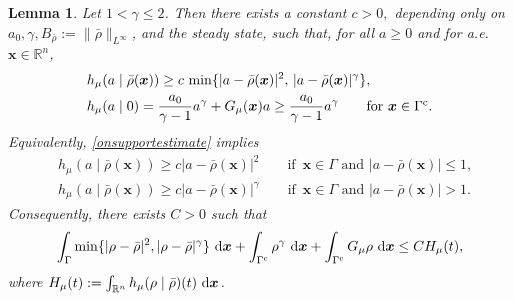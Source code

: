 \documentclass[reqno,11pt]{amsart}
\numberwithin{equation}{section}
\newtheorem{lemma}[theorem]{Lemma}
\theoremstyle{definition}
\def\dd{{\, \rm d}}
\begin{document}
\begin{lemma}\label{coer}
Let $1<\gamma\le2$. Then there exists a constant $c>0,$ depending only 
on $a_0,\gamma,B_{\bar{\rho}}:=\|\bar\rho\|_{L^\infty}$, and the steady state, 
such that, for all $a\ge0$ and for {\it a.e.} $\boldsymbol{x}\in\mathbb R^n$,
\begin{align}  
&h_\mu(a\mid\bar\rho(\boldsymbol{x}))
 \ge c\,\min\{|a-\bar\rho(\boldsymbol{x})|^2,\,|a-\bar\rho(\boldsymbol{x})|^\gamma\},
\label{onsupportestimate}\\
&h_\mu(a\mid0)
 =\frac{a_0}{\gamma-1}a^\gamma+G_\mu(\boldsymbol{x})a
 \ge \frac{a_0}{\gamma-1}a^\gamma
\qquad\mbox{for $\boldsymbol{x}\in \Gamma^{\rm c}$}.\label{offestimate}
\end{align}
Equivalently, \eqref{onsupportestimate} implies
\begin{align}
 &h_\mu(a\mid\bar\rho(\boldsymbol{x}))
 \ge c |a-\bar\rho(\boldsymbol{x})|^2
 \qquad\text{if $\,\boldsymbol{x}\in\Gamma$ and 
 $|a-\bar\rho(\boldsymbol{x})|\le1$},\label{onsupportsplit}\\
&h_\mu(a\mid\bar\rho(\boldsymbol{x}))
 \ge c |a-\bar\rho(\boldsymbol{x})|^\gamma
 \qquad\text{if $\,\boldsymbol{x}\in\Gamma$ and 
 $|a-\bar\rho(\boldsymbol{x})|>1$}. \label{onsupportsplitlarge}
\end{align}
Consequently, there exists $C>0$ such that
\begin{equation}\label{Hmuestimate}
  \int_\Gamma\min\{|\rho-\bar\rho|^2,|\rho-\bar\rho|^\gamma\}\,\dd\boldsymbol{x}
  +\int_{\Gamma^{\rm c}}\rho^\gamma\,\dd\boldsymbol{x}
 +\int_{\Gamma^{\rm c}}G_\mu\rho\,\dd\boldsymbol{x}
 \le C H_\mu(t),
\end{equation}
where $H_\mu(t):=\int_{\mathbb R^n}h_\mu(\rho\mid\bar\rho)(t)\,\dd\boldsymbol{x}$.
\end{lemma}
\end{document}
